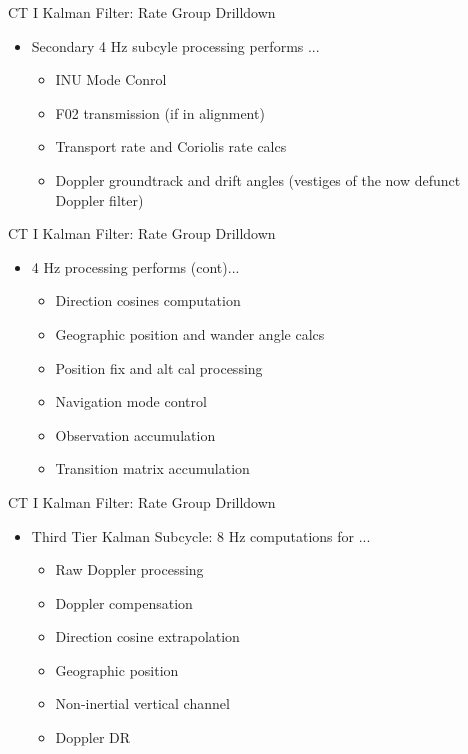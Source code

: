\begin{frame}
CT I Kalman Filter: Rate Group Drilldown
\begin{itemize}
  \item Secondary 4 Hz subcyle processing performs ...
  \begin{itemize}
	\item INU Mode Conrol
  	\item F02 transmission (if in alignment)
	\item Transport rate and Coriolis rate calcs
	\item Doppler groundtrack and drift angles (vestiges of the now defunct Doppler filter)
  \end{itemize}
\end{itemize} 
\end{frame}

\begin{frame}
CT I Kalman Filter: Rate Group Drilldown
\begin{itemize}
  \item 4 Hz processing performs (cont)...
  \begin{itemize}
	\item Direction cosines computation
	\item Geographic position and wander angle calcs
	\item Position fix and alt cal processing
	\item Navigation mode control
	\item Observation accumulation
	\item Transition matrix accumulation
  \end{itemize}
\end{itemize} 
\end{frame}

\begin{frame}
CT I Kalman Filter: Rate Group Drilldown
\begin{itemize}
  \item Third Tier Kalman Subcycle: 8 Hz computations for ...
	\begin{itemize}
		\item Raw Doppler processing
		\item Doppler compensation
		\item Direction cosine extrapolation
		\item Geographic position
		\item Non-inertial vertical channel
		\item Doppler DR
	\end{itemize}
\end{itemize} 
\end{frame}

